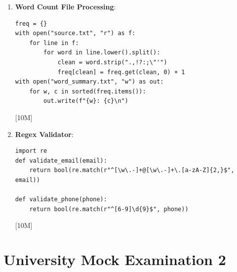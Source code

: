 \begin{solutionbox}
\begin{enumerate}[start=17]
\begin{lstlisting}[language=Python3]
class SavingsAccount(Account):
    def __init__(self, acc_id, balance, rate=0.04):
        super().__init__(acc_id, balance)
        self.rate = rate
    def add_interest(self):
        interest = self.get_balance() * self.rate
        self.deposit(interest)
    \end{lstlisting} [10M]
    \item \textbf{Word Count File Processing}:
    \begin{lstlisting}[language=Python3]
freq = {}
with open("source.txt", "r") as f:
    for line in f:
        for word in line.lower().split():
            clean = word.strip(".,!?:;\"'")
            freq[clean] = freq.get(clean, 0) + 1
with open("word_summary.txt", "w") as out:
    for w, c in sorted(freq.items()):
        out.write(f"{w}: {c}\n")
    \end{lstlisting} [10M]
    \item \textbf{Regex Validator}:
    \begin{lstlisting}[language=Python3]
import re
def validate_email(email):
    return bool(re.match(r"^[\w\.-]+@[\w\.-]+\.[a-zA-Z]{2,}$", email))

def validate_phone(phone):
    return bool(re.match(r"^[6-9]\d{9}$", phone))
    \end{lstlisting} [10M]
\end{enumerate}
\end{solutionbox}

\section{University Mock Examination 2}

